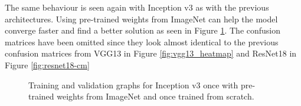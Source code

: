 \begin{table}[h] \centering
{}
\caption{Hyper parameters for Inception v3 optimized with SigOpt. First row shows hyperparameters training the architecture from scratch. Second row used pre-trained weights from ImageNet}
\label{tbl:Inceptionv3_overview}
\end{table}

The same behaviour is seen again with Inception v3 as with the previous architectures. Using pre-trained weights from ImageNet can help the model converge faster and find a better solution as seen in Figure \ref{fig:inception-graph}. The confusion matrices have been omitted since they look almost identical to the previous confusion matrices from VGG13 in Figure \ref{fig:vgg13_heatmap} and ResNet18 in Figure \ref{fig:resnet18-cm}

\begin{figure}[h]
\centering
\caption{Training and validation graphs for Inception v3 once with pre-trained weights from ImageNet and once trained from scratch.}
\label{fig:inception-graph}
\end{figure}

